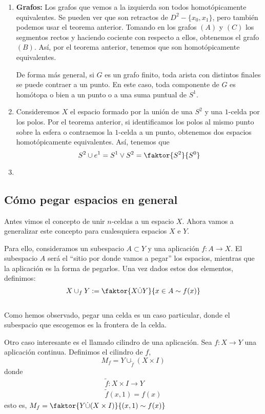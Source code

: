 \begin{ejems}
\begin{enumerate}
\item \textbf{Grafos:} Los grafos que vemos a la izquierda son todos homotópicamente equivalentes. Se pueden ver que son retractos de $D^2 - \{x_0, x_1\}$, pero también podemos usar el teorema anterior. Tomando en los grafos $(A)$ y $(C)$ los segmentos rectos y haciendo cociente con respecto a ellos, obtenemos el grafo $(B)$. Así, por el teorema anterior, tenemos que son homotópicamente equivalentes. \par 
De forma más general, si $G$ es un grafo finito, toda arista con distintos finales se puede contraer a un punto. En este caso, toda componente de $G$ es homótopa o bien a un punto o a una suma puntual de $S^1$.

\item Consideremos $X$ el espacio formado por la unión de una $S^2$ y una $1$-celda por los polos. Por el teorema anterior, si identificamos los polos al mismo punto sobre la esfera o contraemos la $1$-celda a un punto, obtenemos dos espacios homotópicamente equivalentes. Así, tenemos que
\[ S^2 \cup e^1 = S^1 \vee S^2 = \faktor{S^2}{S^0} \]

\item {}
\end{enumerate}
\end{ejems}

\subsection{Cómo pegar espacios en general}
Antes vimos el concepto de unir $n$-celdas a un espacio $X$. Ahora vamos a generalizar este concepto para cualesquiera espacios $X$ e $Y$. \par 
Para ello, consideramos un subespacio $A \subset Y $ y una aplicación $f : A \longrightarrow X$. El subespacio $A$ será el ``sitio por donde vamos a pegar'' los espacios, mientras que la aplicación es la forma de pegarlos. Una vez dados estos dos elementos, definimos:
\[ X \cup_f Y := \faktor{X \dot{\cup} Y}{x \in A \sim f(x)} \]
 \\
Como hemos observado, pegar una celda es un caso particular, donde el subespacio que escogemos es la frontera de la celda. \par 
Otro caso interesante es el llamado cilindro de una aplicación. Sea $f: X \longrightarrow Y$ una aplicación continua. Definimos el cilindro de $f$, 
\[M_f = Y \cup_{\tilde{f}} (X \times I) \] 
donde
\begin{align*}
\tilde{f} : X \times I \longrightarrow Y \\
\tilde{f}(x,1) = f(x)
\end{align*}
esto es, $M_f = \faktor{Y \dot{\cup} (X \times I)}{(x,1) \sim f(x)}$

